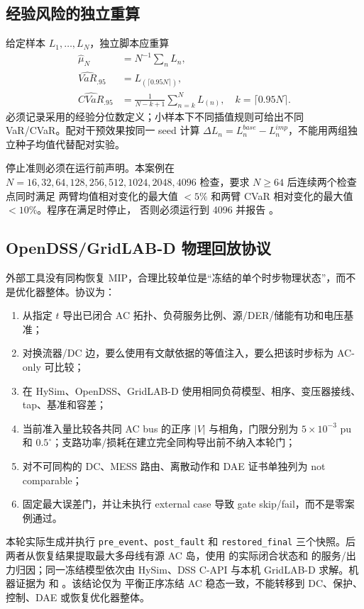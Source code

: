 \subsection{经验风险的独立重算}

给定样本 $L_1,\ldots,L_N$，独立脚本应重算
\begin{align}
 \widehat\mu_N&=N^{-1}\sum_nL_n,\\
 \widehat{VaR}_{.95}&=L_{(\lceil0.95N\rceil)},\\
 \widehat{CVaR}_{.95}&=\frac{1}{N-k+1}\sum_{n=k}^{N}L_{(n)},
 \quad k=\lceil0.95N\rceil.
\end{align}
必须记录采用的经验分位数定义；小样本下不同插值规则可给出不同 VaR/CVaR。配对干预效果按同一 seed
计算 $\Delta L_n=L_n^{base}-L_n^{imp}$，不能用两组独立种子均值代替配对实验。

停止准则必须在运行前声明。本案例在
$N=16,32,64,128,256,512,1024,2048,4096$ 检查，要求 $N\ge64$ 后连续两个检查点同时满足
两臂均值相对变化的最大值 $<5\%$ 和两臂 CVaR 相对变化的最大值 $<10\%$。程序在满足时停止，
否则必须运行到 4096 并报告 。

\subsection{OpenDSS/GridLAB-D 物理回放协议}

外部工具没有同构恢复 MIP，合理比较单位是“冻结的单个时步物理状态”，而不是优化器整体。协议为：
\begin{enumerate}
 \item 从指定 $t$ 导出已闭合 AC 拓扑、负荷服务比例、源/DER/储能有功和电压基准；
 \item 对换流器/DC 边，要么使用有文献依据的等值注入，要么把该时步标为 AC-only 可比较；
 \item 在 HySim、OpenDSS、GridLAB-D 使用相同负荷模型、相序、变压器接线、tap、基准和容差；
 \item 当前准入量比较各共同 AC bus 的正序 $|V|$ 与相角，门限分别为 $5\times10^{-3}$ pu 和
       $0.5^{\circ}$；支路功率/损耗在建立完全同构导出前不纳入本轮门；
 \item 对不可同构的 DC、MESS 路由、离散动作和 DAE 证书单独列为 not comparable；
 \item 固定最大误差门，并让未执行 external case 导致 gate skip/fail，而不是零案例通过。
\end{enumerate}

本轮实际生成并执行 \texttt{pre\_event}、\texttt{post\_fault} 和
\texttt{restored\_final} 三个快照。后两者从恢复结果提取最大多母线有源 AC 岛，使用
 的实际闭合状态和  的服务/出力归因；同一冻结模型依次由
HySim、DSS C-API 与本机 GridLAB-D 求解。机器证据为
 和 。该结论仅为
平衡正序冻结 AC 稳态一致，不能转移到 DC、保护、控制、DAE 或恢复优化器整体。

